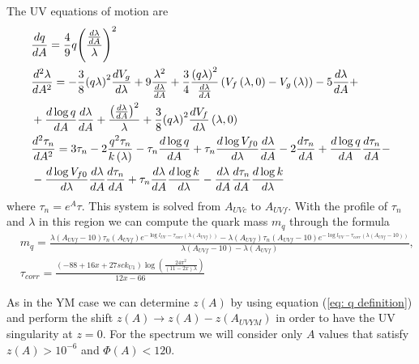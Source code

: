 \documentclass[a4paper,12pt]{article}
\begin{document}
The UV equations of motion are
\begin{align}
&\frac{dq}{dA} =  \frac{4}{9} q {\left(\frac{\frac{d\lambda}{dA}}{\lambda}\right)}^2 \\
&\frac{d^2\lambda}{dA^2} = -\frac{3}{8}  {\left(q \lambda \right)}^2 \frac{d V_g}{d\lambda} + 9 \frac{\lambda^2}{\frac{d\lambda}{dA}} + \frac{3}{4} \frac{{\left(q \lambda \right)}^2}{\frac{d\lambda}{dA}} \left( V_f\left(\lambda, 0\right) - V_g \left(\lambda\right) \right) - 5 \frac{d\lambda}{dA}  + \\
& + \frac{d \log q}{dA} \frac{d\lambda}{d A} + \frac{{\left( \frac{d\lambda}{dA}\right)}^2}{\lambda} + \frac{3}{8} {\left( q \lambda \right)}^2 \frac{d V_f}{d\lambda} \left(\lambda, 0 \right) \\ \notag
& \frac{d^2 \tau_n}{dA^2} = 3 \tau_n - 2 \frac{q^2 \tau_n}{k\left(\lambda\right)} - \tau_n \frac{d \log q}{dA} + \tau_n \frac{d \log V_{f0}}{d\lambda} \frac{d\lambda}{dA} - 2 \frac{d\tau_n}{d A} + \frac{d\log q}{d A} \frac{d \tau_n}{dA} - \\
& - \frac{d \log V_{f0}}{d\lambda} \frac{d\lambda}{dA} \frac{d\tau_n}{dA} + \tau_n \frac{d\lambda}{dA} \frac{d \log k}{d\lambda} - \frac{d\lambda}{dA} \frac{d\tau_n}{dA} \frac{d \log k}{d\lambda}
\end{align}
where $\tau_n = e^A \tau$. This system is solved from $A_{UVc}$ to $A_{UVf}$. With the profile of $\tau_n$ and $\lambda$ in this region we can compute the quark mass $m_q$ through the formula
\begin{align}
&m_q = \frac{\lambda \left(A_{UVf} - 10\right) \tau_n\left(A_{UVf}\right)e^{- \log l_{UV} - \tau_{corr}\left(\lambda\left(A_{UVf}\right)\right)} - \lambda \left(A_{UVf} \right) \tau_n\left(A_{UVf} - 10\right)e^{- \log l_{UV} - \tau_{corr}\left(\lambda\left(A_{UVf} - 10\right)\right)} }{\lambda\left(A_{UVf} - 10\right) - \lambda\left(A_{UVf}\right)}, \\
& \tau_{corr} = \frac{\left(-88 + 16 x + 27 sc k_{U1}\right) \log\left( \frac{24 \pi^2}{\left(11 - 2 x\right) \lambda}\right)}{12 x - 66}
\end{align}

As in the YM case we can determine $z\left(A\right)$ by using equation (\ref{eq: q definition}) and perform the shift $z\left(A\right) \to z\left(A\right) - z\left(A_{UVYM} \right) $ in order to have the UV singularity at $z = 0$. For the spectrum we will consider only  $A$ values that satisfy $z\left(A\right) > 10^{-6}$ and $\Phi\left(A\right) < 120$.
\end{document}
